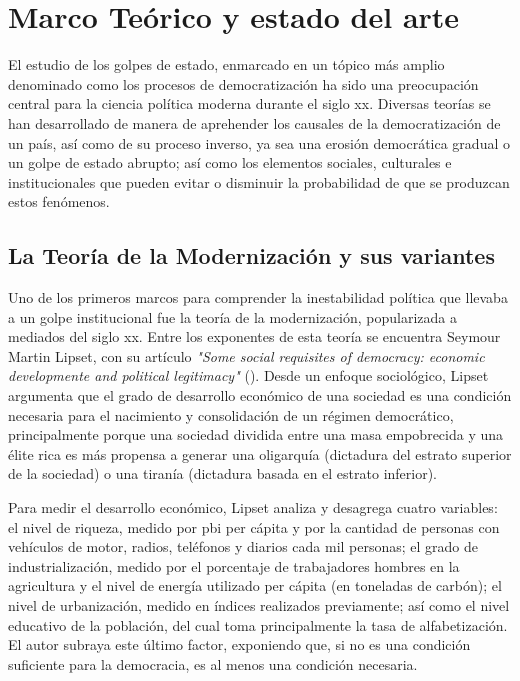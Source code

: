 \documentclass{article}
\begin{document}
\section{Marco Teórico y estado del arte}

El estudio de los golpes de estado, enmarcado en un tópico más amplio denominado
como los procesos de democratización ha sido una 
preocupación central para la ciencia política moderna durante el siglo xx. Diversas teorías
se han desarrollado de manera de aprehender los causales de la democratización
de un país, así como de su proceso inverso, ya sea una erosión democrática gradual o un
golpe de estado abrupto; así como los elementos sociales, culturales e institucionales 
que pueden evitar o disminuir la probabilidad de que se produzcan estos fenómenos.

\subsection{La Teoría de la Modernización y sus variantes}

Uno de los primeros marcos para comprender la inestabilidad política que llevaba a un golpe
institucional fue la teoría de la modernización, popularizada a mediados del siglo xx. 
Entre los exponentes de esta teoría se
encuentra Seymour Martin Lipset, con su artículo \textit{"Some social requisites 
of democracy: economic developmente and political legitimacy"} (\citeyear{lipset1959some}). 
Desde un enfoque sociológico, Lipset
argumenta que el grado de desarrollo económico de una sociedad es una condición 
necesaria para el nacimiento y consolidación de un régimen democrático, principalmente
porque una sociedad dividida entre una masa empobrecida y una élite rica es más
propensa a generar una oligarquía (dictadura del estrato superior de la sociedad) o una
tiranía (dictadura basada en el estrato inferior).

Para medir el desarrollo económico, Lipset analiza y desagrega cuatro variables:
el nivel de riqueza, medido por pbi per cápita y por la cantidad de personas con vehículos 
de motor, radios, teléfonos y diarios cada mil personas; el grado de industrialización, 
medido por el porcentaje de trabajadores hombres en la agricultura y el nivel de energía 
utilizado per cápita (en toneladas de carbón); el nivel de urbanización, medido en índices 
realizados previamente; así como el nivel educativo de la población, del cual toma 
principalmente la tasa de alfabetización. El autor subraya este último factor, exponiendo
que, si no es una condición suficiente para la democracia, es al menos una condición necesaria.
\end{document}
